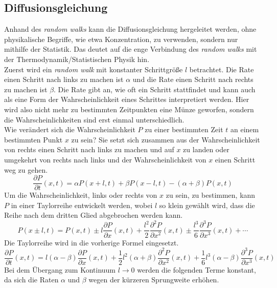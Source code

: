 \documentclass[a4paper, 12pt]{scrartcl}
\begin{document}
\subsection*{Diffusionsgleichung}
Anhand des \emph{random walks} kann die Diffusionsgleichung hergeleitet werden, ohne physikalische Begriffe, wie etwa Konzentration, zu verwenden, sondern nur mithilfe der Statistik. Das deutet auf die enge Verbindung des \emph{random walks} mit der Thermodynamik/Statistischen Physik hin.\\
Zuerst wird ein \emph{random walk} mit konstanter Schrittgröße $l$ betrachtet. Die Rate einen Schritt nach links zu machen ist $\alpha$ und die Rate einen Schritt nach rechts zu machen ist $\beta$. Die Rate gibt an, wie oft ein Schritt stattfindet und kann auch als eine Form der Wahrscheinlichkeit eines Schrittes interpretiert werden. Hier wird also nicht mehr zu bestimmten Zeitpunkten eine Münze geworfen, sondern die Wahrscheinlichkeiten sind erst einmal unterschiedlich.\\ Wie verändert sich die Wahrscheinlichkeit $P$ zu einer bestimmten Zeit $t$ an einem bestimmten Punkt $x$ zu sein? Sie setzt sich zusammen aus der Wahrscheinlichkeit von rechts einen Schritt nach links zu machen und auf $x$ zu landen oder umgekehrt von rechts nach links und der Wahrscheinlichkeit von $x$ einen Schritt weg zu gehen.
\begin{equation}
  \frac{\partial P}{\partial t} (x, t) = \alpha P(x + l, t) + \beta P(x - l, t) - (\alpha + \beta) P(x, t)
\end{equation}
Um die Wahrscheinlichkeit, links oder rechts von $x$ zu sein, zu bestimmen,  kann $P$ in einer Taylorreihe entwickelt werden, wobei $l$ so klein gewählt wird, dass die Reihe nach dem dritten Glied abgebrochen werden kann.
\begin{equation}
  P(x \pm l, t) = P(x, t) \pm l \frac{\partial P}{\partial x}(x, t) + \frac{l^2}{2} \frac{\partial^2 P}{\partial x^2}(x, t) \pm \frac{l^3}{6} \frac{\partial^3 P}{\partial x^3}(x, t) + \cdots
\end{equation}
Die Taylorreihe wird in die vorherige Formel eingesetzt.
\begin{equation}
  \frac{\partial P}{\partial t} (x, t) = l (\alpha - \beta) \frac{\partial P}{\partial x}(x, t) + \frac{1}{2} l^2 (\alpha + \beta) \frac{\partial^2 P}{\partial x^2}(x, t) + \frac{1}{6} l^3 (\alpha - \beta) \frac{\partial^3 P}{\partial x^3}(x, t)
\end{equation}
Bei dem Übergang zum Kontinuum $l \to 0$ werden die folgenden Terme konstant, da sich die Raten $\alpha$ und $\beta$ wegen der kürzeren Sprungweite erhöhen.
\end{document}
